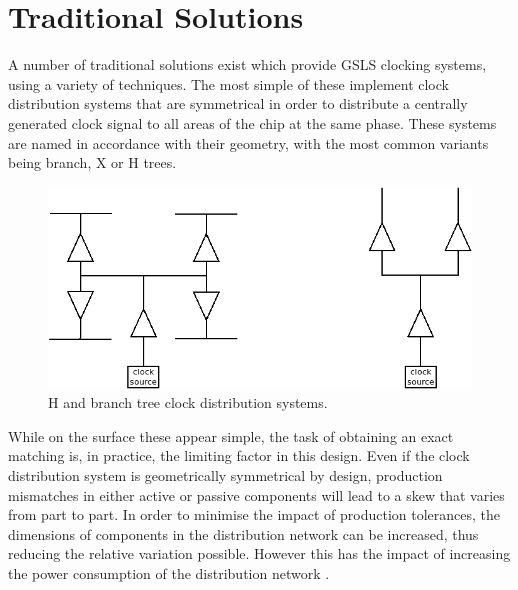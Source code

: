 \section{Traditional Solutions}
A number of traditional solutions exist which provide \ac{GSLS} clocking systems, using a variety of techniques. The most simple of these implement clock distribution systems that are symmetrical in order to distribute a centrally generated clock signal to all areas of the chip at the same phase. These systems are named in accordance with their geometry, with the most common variants being branch, X or H trees. 
\begin{figure}[h]
	\centering
	\includegraphics[scale=0.33]{../trees}
	\caption[H and branch tree clock distribution systems]{H and branch tree clock distribution systems.}
	\label{fig:trees}
\end{figure}

While on the surface these appear simple, the task of obtaining an exact matching is, in practice, the limiting factor in this design. Even if the clock distribution system is geometrically symmetrical by design, production mismatches in either active or passive components will lead to a skew that varies from part to part. In order to minimise the impact of production tolerances, the dimensions of components in the distribution network can be increased, thus reducing the relative variation possible. However this has the impact of increasing the power consumption of the distribution network \cite{tiwari1998reducing}.

